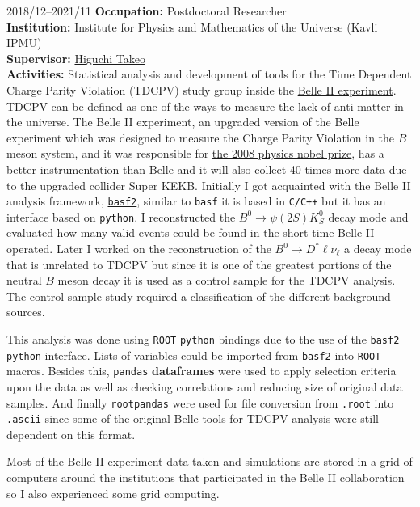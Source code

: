 \documentclass[a4paper]{article}
\begin{document}
\begin{CV}
\item[2018/12--2021/11] \textbf{Occupation:} Postdoctoral Researcher
  \\ \textbf{Institution:} Institute for Physics and Mathematics of the Universe
  (Kavli IPMU)
  \\ \textbf{Supervisor:} \href{https://db.ipmu.jp/member/personal/2440en.html}{Higuchi Takeo}
  \\ \textbf{Activities:} Statistical analysis and development of tools for the
  Time Dependent Charge Parity Violation (TDCPV) study group inside
  the \href{https://www.belle2.org/project/super_kekb_and_belle_ii}{Belle II
    experiment}. TDCPV can be defined as one of the ways to
  measure the lack of anti-matter in the universe. The Belle II experiment, an
  upgraded version of the Belle experiment which was designed to measure the
  Charge Parity Violation in the $B$ meson system, and it was responsible for
  \href{https://belle.kek.jp/belle/km_nobel/index.html}{the 2008 physics nobel
    prize}, has a better instrumentation than Belle and it will also collect 40
  times more data due to the upgraded collider Super KEKB.
  Initially I got acquainted with the Belle II analysis framework, \href{https://github.com/belle2/basf2}{\texttt{basf2}},
  similar to \texttt{basf} it is based in \texttt{C/C++} but it has an interface
  based on \texttt{python}.
  I reconstructed the $B^0 \rightarrow \psi(2S) K^{0}_{S}$ decay mode and
  evaluated how many valid events could be found in the short time Belle II operated.
  Later I worked on the reconstruction of the $B^0 \rightarrow D^* \ell
  \nu_\ell$ a decay mode that is unrelated to TDCPV but since it is one of the
  greatest portions of the neutral $B$ meson decay it is used as a control
  sample for the TDCPV analysis.
  The control sample study required a classification of the different background
  sources.

  This analysis was done using \texttt{ROOT} \texttt{python} bindings due to the
  use of the \texttt{basf2} \texttt{python} interface. Lists of variables could
  be imported from \texttt{basf2} into \texttt{ROOT} macros. Besides this, \texttt{pandas} \textbf{dataframes}
  were used to apply selection criteria upon the data as well as checking
  correlations and reducing size of original data samples. And finally
  \texttt{rootpandas} were used for file conversion from \texttt{.root} into
  \texttt{.ascii} since some of the original Belle tools for TDCPV analysis were
  still dependent on this format.

  Most of the Belle II experiment data taken and simulations are stored in a
  grid of computers around the institutions that participated in the Belle II
  collaboration so I also experienced some grid computing.


\end{CV}
\end{document}
